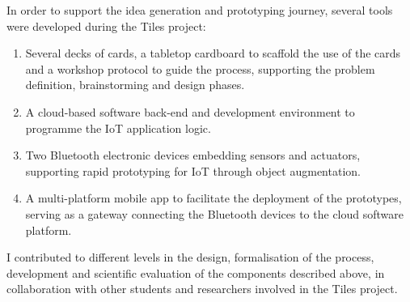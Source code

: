 In order to support the idea generation and prototyping journey, several tools were developed during the Tiles project:

\begin{enumerate}
    \item Several decks of cards, a tabletop cardboard to scaffold the use of the cards and a workshop protocol to guide the process, supporting the problem definition, brainstorming and design phases.
    \item A cloud-based software back-end and development environment to programme the IoT application logic.
    \item Two Bluetooth electronic devices embedding sensors and actuators, supporting rapid prototyping for IoT through object augmentation.
    \item A multi-platform mobile app to facilitate the deployment of the prototypes, serving as a gateway connecting the Bluetooth devices to the cloud software platform.
\end{enumerate}

I contributed to different levels in the design, formalisation of the process, development and scientific evaluation of the components described above, in collaboration with other students and researchers involved in the Tiles project.

